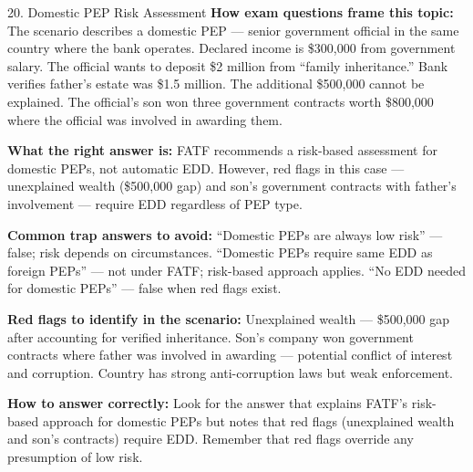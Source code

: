 \documentclass[11pt,a4paper]{beamer}
\begin{document}
	\begin{frame}{20. Domestic PEP Risk Assessment}
		\tiny
		\noindent\textbf{How exam questions frame this topic:} The scenario describes a domestic PEP — senior government official in the same country where the bank operates. Declared income is \$300,000 from government salary. The official wants to deposit \$2 million from “family inheritance.” Bank verifies father's estate was \$1.5 million. The additional \$500,000 cannot be explained. The official's son won three government contracts worth \$800,000 where the official was involved in awarding them.
		
		\vspace{0.1cm}
		\noindent\textbf{What the right answer is:} FATF recommends a risk-based assessment for domestic PEPs, not automatic EDD. However, red flags in this case — unexplained wealth (\$500,000 gap) and son's government contracts with father's involvement — require EDD regardless of PEP type.
		
		\vspace{0.1cm}
		\noindent\textbf{Common trap answers to avoid:} “Domestic PEPs are always low risk” — false; risk depends on circumstances. “Domestic PEPs require same EDD as foreign PEPs” — not under FATF; risk-based approach applies. “No EDD needed for domestic PEPs” — false when red flags exist.
		
		\vspace{0.1cm}
		\noindent\textbf{Red flags to identify in the scenario:} Unexplained wealth — \$500,000 gap after accounting for verified inheritance. Son's company won government contracts where father was involved in awarding — potential conflict of interest and corruption. Country has strong anti-corruption laws but weak enforcement.
		
		\vspace{0.1cm}
		\noindent\textbf{How to answer correctly:} Look for the answer that explains FATF's risk-based approach for domestic PEPs but notes that red flags (unexplained wealth and son's contracts) require EDD. Remember that red flags override any presumption of low risk.
	\end{frame}
	
\end{document}

